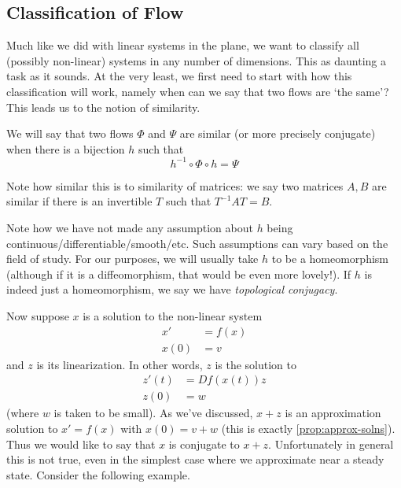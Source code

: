 \subsection{Classification of Flow}
Much like we did with linear systems in the plane, we want to classify all (possibly non-linear) systems in any number of dimensions. This as daunting a task as it sounds. At the very least, we first need to start with how this classification will work, namely when can we say that two flows are `the same'? This leads us to the notion of similarity.

We will say that two flows $\Phi$ and $\Psi$ are similar (or more precisely conjugate) when there is a bijection $h$ such that
$$ h^{-1} \circ \Phi \circ h = \Psi$$
\begin{remark}
    Note how similar this is to similarity of matrices: we say two matrices $A, B$ are similar if there is an invertible $T$ such that $T^{-1}AT = B$.
\end{remark}
Note how we have not made any assumption about $h$ being continuous/differentiable/smooth/etc. Such assumptions can vary based on the field of study. For our purposes, we will usually take $h$ to be a homeomorphism (although if it is a diffeomorphism, that would be even more lovely!). If $h$ is indeed just a homeomorphism, we say we have \textit{topological conjugacy}.


Now suppose $x$ is a solution to the non-linear system
\begin{align*}
    x' &= f(x)\\
    x(0) &= v
\end{align*}
and $z$ is its linearization. In other words, $z$ is the solution to
\begin{align*}
    z'(t) &= Df(x(t)) z\\
    z(0) &= w
\end{align*}
(where $w$ is taken to be small). 
As we've discussed, $x + z$ is an approximation solution to $x' = f(x)$ with $x(0) = v + w$ (this is exactly \autoref{prop:approx-solns}). Thus we would like to say that $x$ is conjugate to $x + z$. Unfortunately in general this is not true, even in the simplest case where we approximate near a steady state. Consider the following example.

